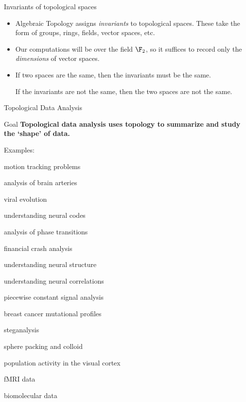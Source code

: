 \documentclass[usenames,dvipsnames,aspectratio=1610]{beamer}
\begin{document}
\begin{frame}{Invariants of topological spaces}
  \begin{itemize}
    \item Algebraic Topology assigns {\em invariants} to topological spaces.
      These take the form of groups, rings, fields, vector spaces, etc.
    \item Our computations will be over the field $\F_2$, so it suffices to record
      only the {\em dimensions} of vector spaces. 
    \item If two spaces are the same, then the invariants must be the same. 
      
      If the invariants are not the same, then the two spaces are not the same.
  \end{itemize}
\end{frame}

\begin{frame}{Topological Data Analysis}
  \begin{alertblock}{Goal}
    {\bf Topological data analysis uses topology to summarize and study the
    `shape' of data.}
  \end{alertblock}
  \pause
  Examples:
  \begin{itemize}
  \begin{multicols}{2}
    \item motion tracking problems
    \item analysis of brain arteries
    \item viral evolution
    \item understanding neural codes
    \item analysis of phase transitions
    \item financial crash analysis
    \item understanding neural structure
    \item understanding neural correlations
    \item piecewise constant signal analysis
    \item breast cancer mutational profiles
    \item steganalysis
    \item sphere packing and colloid
    \item population activity in the visual cortex
    \item fMRI data
    \item biomolecular data
    \end{multicols}

  \end{itemize}
\end{frame}
\end{document}
